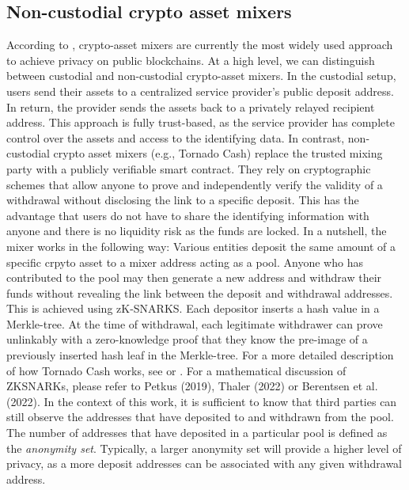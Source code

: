 \documentclass[12pt,a4paper,titlepage,oneside,english]{article}
\begin{document}
\subsection{Non-custodial crypto asset mixers}
According to \cite{nadler2023tornado}, crypto-asset mixers are currently the most widely used approach to achieve privacy on public blockchains. At a high level, we can distinguish between custodial and non-custodial crypto-asset mixers. \newline
In the custodial setup, users send their assets to a centralized service provider's public deposit address. In return, the provider sends the assets back to a privately relayed recipient address. This approach is fully trust-based, as the service provider has complete control over the assets and access to the identifying data. \newline 
In contrast, non-custodial crypto asset mixers (e.g., Tornado Cash) replace the trusted mixing party with a publicly verifiable smart contract. They rely on cryptographic schemes that allow anyone to prove and independently verify the validity of a withdrawal without disclosing the link to a specific deposit. This has the advantage that users do not have to share the identifying information with anyone and there is no liquidity risk as the funds are locked. \citep{nadler2023tornado} \newline
In a nutshell, the mixer works in the following way: Various entities deposit the same amount of a specific crpyto asset to a mixer address acting as a pool. Anyone who has contributed to the pool may then generate a new address and withdraw their funds without revealing the link between the deposit and withdrawal addresses. This is achieved using zK-SNARKS. 
Each depositor inserts a hash value in a Merkle-tree. At the time of withdrawal, each legitimate withdrawer can prove unlinkably with a zero-knowledge proof that they know the pre-image of a previously inserted hash leaf in the Merkle-tree. %
 For a more detailed description of how Tornado Cash works, see \cite{nadler2023tornado} or \cite{Beres2020}. For a mathematical discussion of ZKSNARKs, please refer to Petkus (2019), Thaler (2022) or Berentsen et al. (2022). \newline
In the context of this work, it is sufficient to know that third parties can still observe the addresses that have deposited to and withdrawn from the pool. The number of addresses that have deposited in a particular pool is defined as the \textit{anonymity set}. Typically, a larger anonymity set will provide a higher level of privacy, as a more deposit addresses can be associated with any given withdrawal address. \newline
\end{document}
